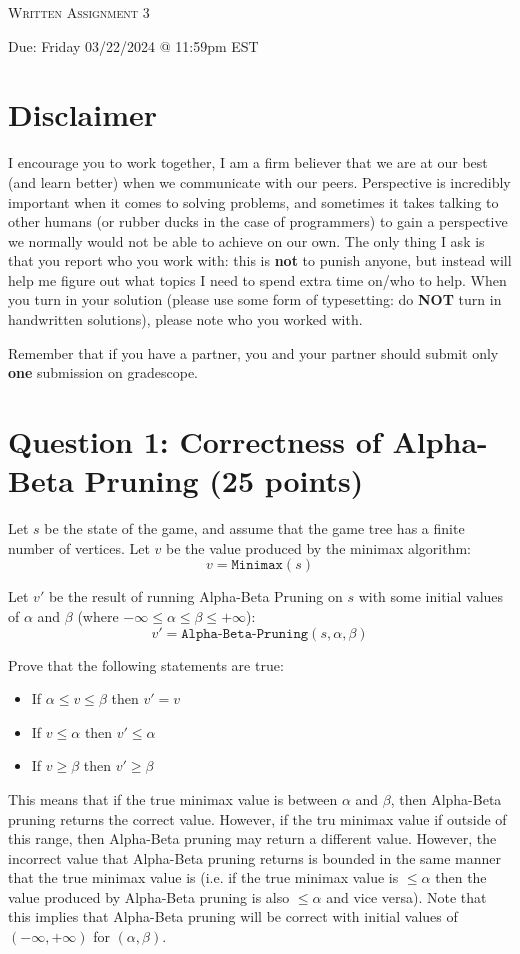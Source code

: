 \documentclass[11pt]{article}
\newcommand{\question}[1]{\section*{\normalsize #1}}
\begin{document}
\begin{center}
    {\Large \textsc{Written Assignment 3}}
\end{center}
\begin{center}
    Due: Friday 03/22/2024 @ 11:59pm EST
\end{center}

\section*{\textbf{Disclaimer}}
I encourage you to work together, I am a firm believer that we are at our best (and learn better) when we communicate with our peers. Perspective is incredibly important when it comes to solving problems, and sometimes it takes talking to other humans (or rubber ducks in the case of programmers) to gain a perspective we normally would not be able to achieve on our own. The only thing I ask is that you report who you work with: this is \textbf{not} to punish anyone, but instead will help me figure out what topics I need to spend extra time on/who to help. When you turn in your solution (please use some form of typesetting: do \textbf{NOT} turn in handwritten solutions), please note who you worked with.\newline

\noindent Remember that if you have a partner, you and your partner should submit only \textbf{one} submission on gradescope.

\question{Question 1: Correctness of Alpha-Beta Pruning (25 points)}
Let $s$ be the state of the game, and assume that the game tree has a finite number of vertices. Let $v$ be the value produced by the minimax algorithm:
$$v = \texttt{Minimax}(s)$$

\noindent Let $v'$ be the result of running Alpha-Beta Pruning on $s$ with some initial values of $\alpha$ and $\beta$ (where $-\infty\le \alpha\le\beta\le+\infty$):
$$v' = \texttt{Alpha-Beta-Pruning}(s, \alpha, \beta)$$

\noindent Prove that the following statements are true:
\begin{itemize}
    \item If $\alpha \le v \le \beta$ then $v' = v$
    \item If $v\le \alpha$ then $v'\le \alpha$
    \item If $v \ge \beta$ then $v'\ge \beta$
\end{itemize}

\noindent This means that if the true minimax value is between $\alpha$ and $\beta$, then Alpha-Beta pruning returns the correct value. However, if the tru minimax value if outside of this range, then Alpha-Beta pruning may return a different value. However, the incorrect value that Alpha-Beta pruning returns is bounded in the same manner that the true minimax value is (i.e. if the true minimax value is $\le \alpha$ then the value produced by Alpha-Beta pruning is also $\le \alpha$ and vice versa). Note that this implies that Alpha-Beta pruning will be correct with initial values of $(-\infty, +\infty)$ for $(\alpha, \beta)$.\newline\newline
\end{document}
